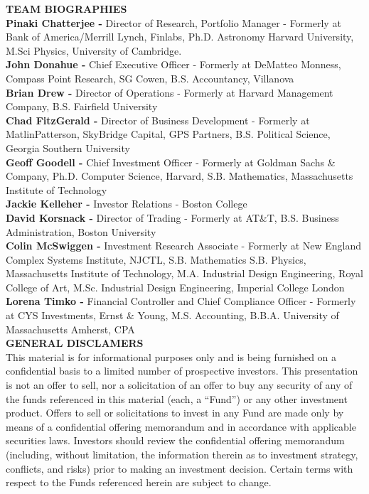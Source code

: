 \documentclass[9pt]{article}
\begin{document}
\textbf{\textcolor{phaseGold}{TEAM BIOGRAPHIES}} \\
  \textbf{Pinaki Chatterjee -} Director of Research, Portfolio Manager - Formerly
    at Bank of America/Merrill Lynch, Finlabs, Ph.D. Astronomy Harvard University,
    M.Sci Physics, University of Cambridge. \\
  \textbf{John Donahue -} Chief Executive Officer - Formerly at DeMatteo Monness,
    Compass Point Research, SG Cowen, B.S. Accountancy, Villanova \\
  \textbf{Brian Drew -} Director of Operations - Formerly at Harvard Management
    Company, B.S. Fairfield University \\
  \textbf{Chad FitzGerald -} Director of Business Development - Formerly at
    MatlinPatterson, SkyBridge Capital, GPS Partners, B.S. Political Science,
    Georgia Southern University \\
  \textbf{Geoff Goodell -} Chief Investment Officer - Formerly at Goldman Sachs
    \& Company, Ph.D. Computer Science, Harvard, S.B. Mathematics, Massachusetts
    Institute of Technology \\
  \textbf{Jackie Kelleher -} Investor Relations - Boston College \\
  \textbf{David Korsnack -} Director of Trading - Formerly at AT\&T, B.S. Business
    Administration, Boston University \\
  \textbf{Colin McSwiggen -} Investment Research Associate - Formerly at New
    England Complex Systems Institute, NJCTL, S.B. Mathematics S.B. Physics,
    Massachusetts Institute of Technology, M.A. Industrial Design Engineering,
    Royal College of Art, M.Sc. Industrial Design Engineering, Imperial College
    London \\
  \textbf{Lorena Timko -} Financial Controller and Chief Compliance Officer -
    Formerly at CYS Investments, Ernst \& Young, M.S. Accounting, B.B.A. University
    of Massachusetts Amherst, CPA \\

\newpage
\textbf{GENERAL DISCLAMERS} \\

This material is for informational purposes only and is being
furnished on a confidential basis to a limited number of prospective investors.
This presentation is not an offer to sell, nor a solicitation of an offer to
buy any security of any of the funds referenced in this material (each, a
``Fund'') or any other investment product.  Offers to sell or solicitations to
invest in any Fund are made only by means of a confidential offering memorandum
and in accordance with applicable securities laws.  Investors should review the
confidential offering memorandum (including, without limitation, the
information therein as to investment strategy, conflicts, and risks) prior to
making an investment decision.  Certain terms with respect to the Funds
referenced herein are subject to change. \\
\end{document}

